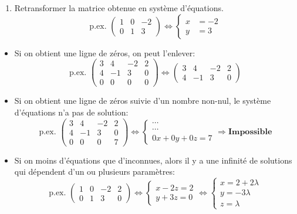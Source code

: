 \begin{enumerate}
\begin{enumerate}
\end{enumerate}
\item Retransformer la matrice obtenue en système d'équations.
\[\text{p.ex. }  \left(\begin{array}{cc|c} 1 & 0 & -2 \\ 0 & 1 & 3  \end{array}\right) \Leftrightarrow \begin{cases} x &= -2 \\ y &= 3 \end{cases}  \]
\end{enumerate}

\begin{remark}
\begin{itemize}
\item Si on obtient une ligne de zéros, on peut l'enlever:
\[\text{p.ex. }  \left(\begin{array}{ccc|c} 3 & 4 & -2 & 2 \\ 4 & -1 & 3 & 0 \\ 0 & 0 & 0 & 0 \end{array}\right) \Leftrightarrow  \left(\begin{array}{ccc|c} 3 & 4 & -2 & 2 \\ 4 & -1 & 3 & 0 \end{array}\right) \]
\item Si on obtient une ligne de zéros suivie d'un nombre non-nul, le système d'équations n'a pas de solution:
\[\text{p.ex. }  \left(\begin{array}{ccc|c} 3 & 4 & -2 & 2 \\ 4 & -1 & 3 & 0 \\ 0 & 0 & 0 & 7 \end{array}\right) \Leftrightarrow  \begin{cases} \cdots \\ \cdots \\ 0x + 0y + 0z = 7 \end{cases} \Rightarrow \textbf{Impossible} \]
\item Si on moins d'équations que d'inconnues, alors il y a une infinité de solutions qui dépendent d'un ou plusieurs paramètres:
\[\text{p.ex. }  \left(\begin{array}{ccc|c} 1 & 0 & -2 & 2 \\ 0 & 1 & 3 & 0 \end{array}\right) \Leftrightarrow  \begin{cases} x - 2z = 2 \\ y + 3z = 0 \end{cases} \Leftrightarrow  \begin{cases} x = 2 + 2\lambda \\ y = -3\lambda \\ z = \lambda \end{cases} \]
\end{itemize}
\end{remark}
